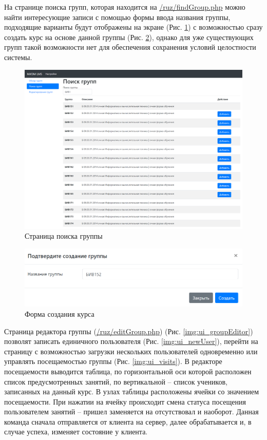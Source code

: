 \documentclass[a4paper,14pt]{article}
\begin{document}
На странице поиска групп, которая находится на \url{/ruz/findGroup.php} можно найти интересующие записи с помощью формы ввода названия группы, подходящие варианты будут отображены на экране (Рис. \ref{img:ui_search}) с возможностью сразу создать курс на основе данной группы (Рис. \ref{img:ui_newGroup}), однако для уже существующих групп такой возможности нет для обеспечения сохранения условий целостности системы.

\begin{figure}[H]
	\centering
	\includegraphics[width=\linewidth]{image/ui_search}
	\caption{Страница поиска группы}
	\label{img:ui_search}
\end{figure}
\begin{figure}[H]
	\centering
	\includegraphics[width=\linewidth]{image/ui_newGroup}
	\caption{Форма создания курса}
	\label{img:ui_newGroup}
\end{figure}

Страница редактора группы (\url{/ruz/editGroup.php}) (Рис. \ref{img:ui_groupEditor}) позволят записать единичного пользователя (Рис. \ref{img:ui_newUser}),  перейти на страницу с возможностью загрузки нескольких пользователей одновременно или управлять посещаемостью группы (Рис. \ref{img:ui_visits}).
В редакторе посещаемости выводится таблица, по горизонтальной оси которой расположен список предусмотренных занятий, по вертикальной -- список учеников, записанных на данный курс. 
В узлах таблицы расположены ячейки со значением посещаемости. 
При нажатии на ячейку происходит смена статуса посещения пользователем занятий -- пришел заменяется на отсутствовал и наоборот. 
Данная команда сначала отправляется от клиента на сервер, далее обрабатывается и, в случае успеха, изменяет состояние у клиента.
\end{document}
